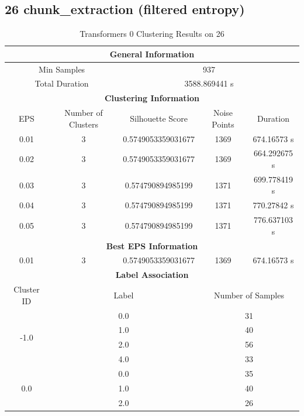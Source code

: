 \subsection{26 chunk\_extraction (filtered entropy)}

\begin{longtable}{|c|c|c|c|c|}
\caption{Transformers 0 Clustering Results on 26} \label{tab:26_transformers_0_clustering_results}\\
\hline
\multicolumn{5}{|c|}{\textbf{General Information}} \\
\hline
\multicolumn{2}{|c|}{Min Samples} & \multicolumn{3}{c|}{937} \\
\multicolumn{2}{|c|}{Total Duration} & \multicolumn{3}{c|}{3588.869441 s} \\
\hline
\multicolumn{5}{|c|}{\textbf{Clustering Information}} \\
\hline
EPS & Number of Clusters & Silhouette Score & Noise Points & Duration \\
0.01 & 3 & 0.5749053359031677 & 1369 & 674.16573 s\\
0.02 & 3 & 0.5749053359031677 & 1369 & 664.292675 s\\
0.03 & 3 & 0.574790894985199 & 1371 & 699.778419 s\\
0.04 & 3 & 0.574790894985199 & 1371 & 770.27842 s\\
0.05 & 3 & 0.574790894985199 & 1371 & 776.637103 s\\
\hline
\multicolumn{5}{|c|}{\textbf{Best EPS Information}} \\
\hline
0.01 & 3 & 0.5749053359031677 & 1369 & 674.16573 s\\
\hline
\multicolumn{5}{|c|}{\textbf{Label Association}} \\
\hline
Cluster ID & \multicolumn{2}{c|}{Label} & \multicolumn{2}{c|}{Number of Samples} \\
\hline
\multirow{4}{*}{-1.0} & \multicolumn{2}{c|}{0.0} & \multicolumn{2}{c|}{31} \\
& \multicolumn{2}{c|}{1.0} & \multicolumn{2}{c|}{40} \\
& \multicolumn{2}{c|}{2.0} & \multicolumn{2}{c|}{56} \\
& \multicolumn{2}{c|}{4.0} & \multicolumn{2}{c|}{33} \\
\hline
\multirow{4}{*}{0.0} & \multicolumn{2}{c|}{0.0} & \multicolumn{2}{c|}{35} \\
& \multicolumn{2}{c|}{1.0} & \multicolumn{2}{c|}{40} \\
& \multicolumn{2}{c|}{2.0} & \multicolumn{2}{c|}{26} \\

\end{longtable}
